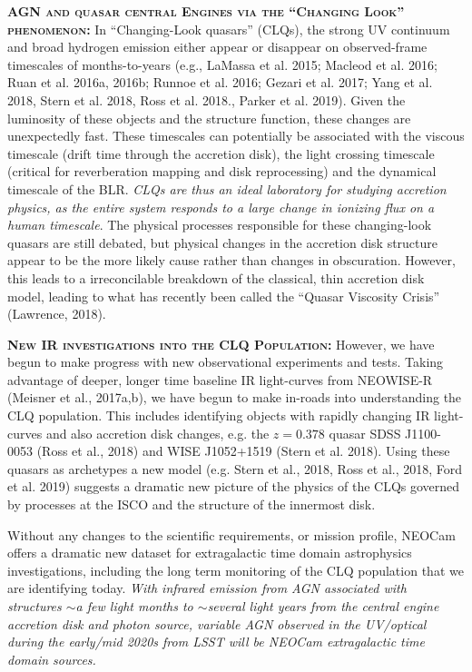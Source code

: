 \documentclass[12pt]{article}
\begin{document}
\smallskip
\smallskip
\noindent
\textbf{\textsc{AGN and quasar central Engines via the ``Changing Look'' phenomenon: }} 
In ``Changing-Look quasars'' (CLQs), the strong UV continuum and broad hydrogen emission either appear or disappear on observed-frame timescales of months-to-years (e.g., LaMassa et al. 2015; Macleod et al. 2016; Ruan et al. 2016a, 2016b; Runnoe et al. 2016; Gezari et al. 2017; Yang et al. 2018, Stern et al. 2018, Ross et al. 2018., Parker et al. 2019). Given the luminosity of these objects and the structure function, these changes are unexpectedly fast. These timescales can potentially be associated with the viscous timescale (drift time through the accretion disk), the light crossing timescale (critical for reverberation mapping and disk reprocessing) and the dynamical timescale of the BLR.  {\it CLQs are thus an ideal laboratory for studying accretion physics, as the entire system responds to a large change in ionizing flux on a human timescale}. The physical processes responsible for these changing-look quasars are still debated, but physical changes in the accretion disk structure appear to be the more likely cause rather than changes in obscuration. However, this leads to a irreconcilable breakdown of the classical, thin accretion disk model, leading to what has recently been called the ``Quasar Viscosity Crisis'' (Lawrence, 2018). 

\smallskip
\smallskip
\noindent
\textbf{\textsc{New IR investigations into the CLQ Population:}}
However, we have begun to make progress with new observational
experiments and tests.  Taking advantage of deeper, longer time baseline 
IR light-curves from NEOWISE-R (Meisner et al., 2017a,b), we have begun to make in-roads
into understanding the CLQ population.  This includes identifying
objects with rapidly changing IR light-curves and also accretion disk
changes, e.g. the $z=0.378$ quasar SDSS J1100-0053 (Ross et al., 2018)
and WISE J1052+1519 (Stern et al. 2018). Using these quasars as
archetypes a new model (e.g. Stern et al., 2018, Ross et al., 2018,
Ford et al. 2019) suggests a dramatic new picture of the physics of
the CLQs governed by processes at the ISCO and the structure of the
innermost disk.


\smallskip
\smallskip
\noindent
Without any changes to the scientific requirements, or mission profile, NEOCam offers 
a dramatic new dataset for extragalactic time domain astrophysics investigations, including
the long term monitoring of the CLQ population that we are identifying today.
{\it With infrared emission from AGN associated with structures $\sim$a few light months to $\sim$several light years from the central engine accretion disk and photon source, variable AGN observed in the UV/optical during the early/mid 2020s from LSST will be NEOCam extragalactic time domain sources.}
\end{document}
